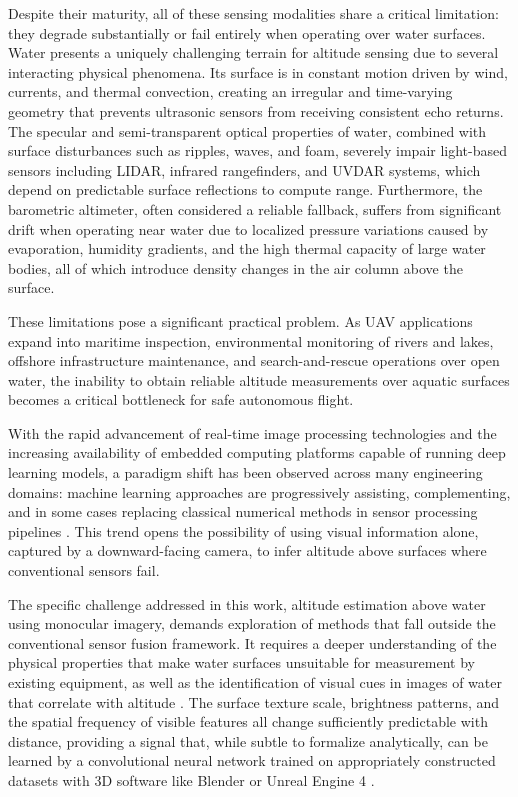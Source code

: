 Despite their maturity, all of these sensing modalities share a critical limitation: they degrade substantially or fail entirely when operating over water surfaces. Water presents a uniquely challenging terrain for altitude sensing due to several interacting physical phenomena. Its surface is in constant motion driven by wind, currents, and thermal convection, creating an irregular and time-varying geometry that prevents ultrasonic sensors from receiving consistent echo returns. The specular and semi-transparent optical properties of water, combined with surface disturbances such as ripples, waves, and foam, severely impair light-based sensors including LIDAR, infrared rangefinders, and UVDAR systems, which depend on predictable surface reflections to compute range. Furthermore, the barometric altimeter, often considered a reliable fallback, suffers from significant drift when operating near water due to localized pressure variations caused by evaporation, humidity gradients, and the high thermal capacity of large water bodies, all of which introduce density changes in the air column above the surface.

These limitations pose a significant practical problem. As UAV applications expand into maritime inspection, environmental monitoring of rivers and lakes, offshore infrastructure maintenance, and search-and-rescue operations over open water, the inability to obtain reliable altitude measurements over aquatic surfaces becomes a critical bottleneck for safe autonomous flight.\cite{UAVCivilAppsJATM}

With the rapid advancement of real-time image processing technologies and the increasing availability of embedded computing platforms capable of running deep learning models, a paradigm shift has been observed across many engineering domains: machine learning approaches are progressively assisting, complementing, and in some cases replacing classical numerical methods in sensor processing pipelines \cite{UAVSensorDNN}. This trend opens the possibility of using visual information alone, captured by a downward-facing camera, to infer altitude above surfaces where conventional sensors fail.

The specific challenge addressed in this work, altitude estimation above water using monocular imagery, demands exploration of methods that fall outside the conventional sensor fusion framework. It requires a deeper understanding of the physical properties that make water surfaces unsuitable for measurement by existing equipment, as well as the identification of visual cues in images of water that correlate with altitude \cite{VIAENetAltitude}. The surface texture scale, brightness patterns, and the spatial frequency of visible features all change sufficiently predictable with distance, providing a signal that, while subtle to formalize analytically, can be learned by a convolutional neural network trained on appropriately constructed datasets with 3D software like Blender or Unreal Engine 4 \cite{WaterDepthSpecular}.

